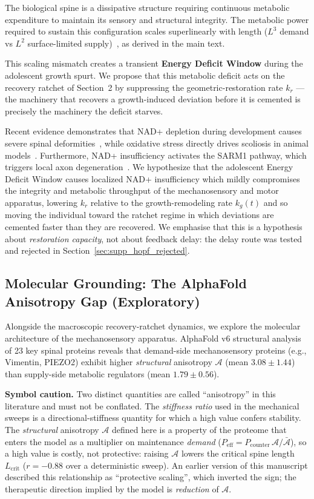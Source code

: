 The biological spine is a dissipative structure requiring continuous metabolic expenditure to maintain its sensory and structural integrity. The metabolic power required to sustain this configuration scales superlinearly with length ($L^3$ demand vs $L^2$ surface-limited supply)~\cite{urban2004nutrition}, as derived in the main text.

This scaling mismatch creates a transient \textbf{Energy Deficit Window} during the adolescent growth spurt. We propose that this metabolic deficit acts on the recovery ratchet of Section~2 by suppressing the geometric-restoration rate $k_r$ --- the machinery that recovers a growth-induced deviation before it is cemented is precisely the machinery the deficit starves.

Recent evidence demonstrates that NAD+ depletion during development causes severe spinal deformities~\cite{basse2021nampt}, while oxidative stress directly drives scoliosis in animal models~\cite{pumputis2025oxidative}. Furthermore, NAD+ insufficiency activates the SARM1 pathway, which triggers local axon degeneration~\cite{gerdts2015sarm1}. We hypothesize that the adolescent Energy Deficit Window causes localized NAD+ insufficiency which mildly compromises the integrity and metabolic throughput of the mechanosensory and motor apparatus, lowering $k_r$ relative to the growth-remodeling rate $k_g(t)$ and so moving the individual toward the ratchet regime in which deviations are cemented faster than they are recovered. We emphasise that this is a hypothesis about \emph{restoration capacity}, not about feedback delay: the delay route was tested and rejected in Section~\ref{sec:supp_hopf_rejected}.

\subsection{Molecular Grounding: The AlphaFold Anisotropy Gap (Exploratory)}

Alongside the macroscopic recovery-ratchet dynamics, we explore the molecular architecture of the mechanosensory apparatus. AlphaFold v6 structural analysis of 23 key spinal proteins reveals that demand-side mechanosensory proteins (e.g., Vimentin, PIEZO2) exhibit higher \emph{structural} anisotropy $\mathcal{A}$ (mean $3.08 \pm 1.44$) than supply-side metabolic regulators (mean $1.79 \pm 0.56$).

\textbf{Symbol caution.} Two distinct quantities are called ``anisotropy'' in this literature and must not be conflated. The \emph{stiffness ratio} used in the mechanical sweeps is a directional-stiffness quantity for which a high value confers stability. The \emph{structural} anisotropy $\mathcal{A}$ defined here is a property of the proteome that enters the model as a multiplier on maintenance \emph{demand} ($P_{\mathrm{eff}} = P_{\mathrm{counter}}\,\mathcal{A}/\bar{\mathcal{A}}$), so a high value is costly, not protective: raising $\mathcal{A}$ lowers the critical spine length $L_{\mathrm{crit}}$ ($r = -0.88$ over a deterministic sweep). An earlier version of this manuscript described this relationship as ``protective scaling'', which inverted the sign; the therapeutic direction implied by the model is \emph{reduction} of $\mathcal{A}$.

